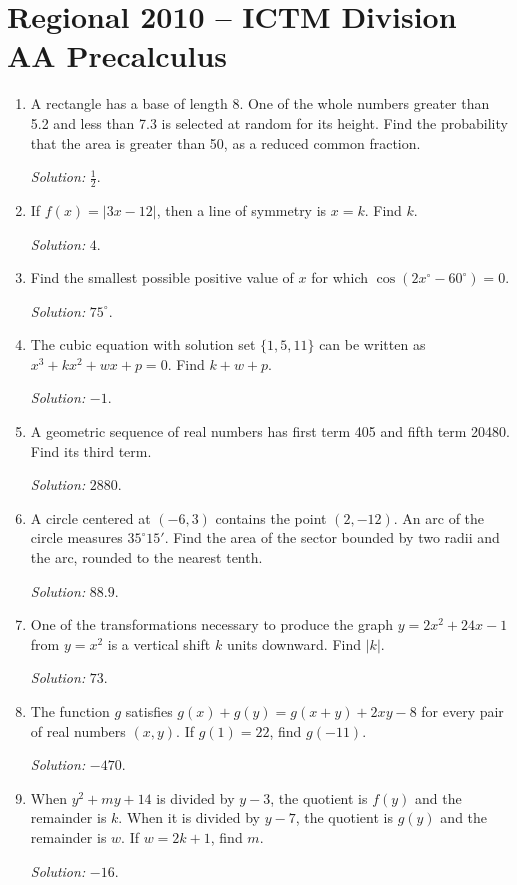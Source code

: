 \documentclass[11pt]{article}
\begin{document}
\section*{Regional 2010 -- ICTM Division AA Precalculus}
\begin{enumerate}[label=\textbf{\arabic*.}]
\item A rectangle has a base of length 8. One of the whole numbers greater than 5.2 and less than 7.3 is selected at random for its height. Find the probability that the area is greater than 50, as a reduced common fraction.\par\textit{Solution: }$\frac12$.

\item If $f(x)=|3x-12|$, then a line of symmetry is $x=k$. Find $k$.\par\textit{Solution: }$4$.

\item Find the smallest possible positive value of $x$ for which $\cos(2x^\circ-60^\circ)=0$.\par\textit{Solution: }$75^\circ$.

\item The cubic equation with solution set $\{1,5,11\}$ can be written as $x^3+kx^2+wx+p=0$. Find $k+w+p$.\par\textit{Solution: }$-1$.

\item A geometric sequence of real numbers has first term 405 and fifth term 20480. Find its third term.\par\textit{Solution: }$2880$.

\item A circle centered at $(-6,3)$ contains the point $(2,-12)$. An arc of the circle measures $35^\circ15'$. Find the area of the sector bounded by two radii and the arc, rounded to the nearest tenth.\par\textit{Solution: }$88.9$.

\item One of the transformations necessary to produce the graph $y=2x^2+24x-1$ from $y=x^2$ is a vertical shift $k$ units downward. Find $|k|$.\par\textit{Solution: }$73$.

\item The function $g$ satisfies $g(x)+g(y)=g(x+y)+2xy-8$ for every pair of real numbers $(x,y)$. If $g(1)=22$, find $g(-11)$.\par\textit{Solution: }$-470$.

\item When $y^2+my+14$ is divided by $y-3$, the quotient is $f(y)$ and the remainder is $k$. When it is divided by $y-7$, the quotient is $g(y)$ and the remainder is $w$. If $w=2k+1$, find $m$.\par\textit{Solution: }$-16$.


\end{enumerate}
\end{document}
